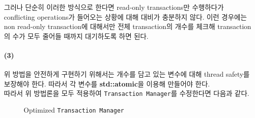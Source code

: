 \documentclass[main.tex]{subfiles}
\begin{document}
그러나 단순히 이러한 방식으로 한다면 read-only transactions만 수행하다가 conflicting operations가 들어오는 상황에 대해 대비가 충분하지 않다.
이런 경우에는 non read-only transaction에 대해서만 전체 transaction의 개수를 체크해 transaction의 수가 모두 줄어들 때까지 대기하도록 하면 된다.

\paragraph{(3)}
위 방법을 안전하게 구현하기 위해서는 개수를 담고 있는 변수에 대해 thread safety를 보장해야 한다. 따라서 각 변수를 \textbf{std::atomic}을 이용해 만들어야 한다.
\\

\noindent 따라서 위 방법론을 모두 적용하여 \texttt{Transaction Manager}를 수정한다면 다음과 같다.

\newpage
\begin{figure}[!hbt]
	\centering
	\caption{Optimized \texttt{Transaction Manager}}
\end{figure}
\end{document}
